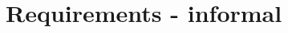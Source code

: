 \documentclass[10pt,a4paper]{article}
\begin{document}
\newcommand\tab[1][1cm]{\hspace*{#1}}

\pagestyle{fancy}
\lhead{}
\cfoot{-- \vspace{0.5cm}\thepage\vspace{0.5cm} --}
\rfoot{}
\renewcommand\headrule{
\begin{minipage}{1\textwidth}
\hrule width \hsize \kern 1mm \hrule width \hsize height 2pt
\end{minipage}}




\tableofcontents

\clearpage


\section{Requirements - informal}



\clearpage

\clearpage
\end{document}
